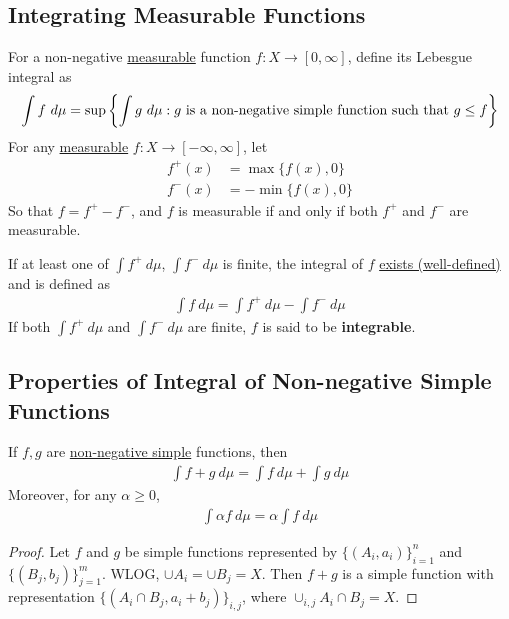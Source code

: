 \documentclass[11pt]{article}
\begin{document}
	\subsection{Integrating Measurable Functions}
	\begin{definition}
		For a non-negative \ul{measurable} function $f: X \to [0, \infty]$, define its Lebesgue integral as
		\begin{align}
			\int f\ d\mu = \sup \left\{\int g\ d\mu : g \text{{ is a non-negative simple function such that }} g \leq f \right\}
		\end{align}
		For any \ul{measurable} $f: X \to [-\infty, \infty]$, let
		\begin{align}
			f^+(x) &= \max\{f(x), 0\} \\
			f^-(x) &= - \min\{f(x), 0\}
		\end{align}
		So that $f = f^+ - f^-$, and $f$ is measurable if and only if both $f^+$ and $f^-$ are measurable.
	
		If at least one of $\int f^+\ d\mu$, $\int f^-\ d\mu$ is finite, the integral of $f$ \ul{exists (well-defined)} and is defined as
		\begin{align}
			\int f\ d\mu = \int f^+\ d\mu - \int f^-\ d\mu	
		\end{align}
		If both $\int f^+\ d\mu$ and $\int f^-\ d\mu$ are finite, $f$ is said to be \textbf{integrable}.
	\end{definition}
	
	\subsection{Properties of Integral of Non-negative Simple Functions}
	\begin{proposition}[Linearity]
		If $f, g$ are \ul{non-negative simple} functions, then
		\begin{align}
			\int f+g\ d\mu = \int f\ d\mu + \int g\ d\mu
		\end{align}
		Moreover, for any $\alpha \geq 0$,
		\begin{align}
			\int \alpha f\ d\mu = \alpha \int f\ d\mu
		\end{align}
		\begin{proof}
			Let $f$ and $g$ be simple functions represented by $\{(A_i, a_i)\}_{i=1}^n$ and $\{(B_j, b_j)\}_{j=1}^m$. WLOG, $\cup A_i = \cup B_j = X$. Then $f + g$ is a simple function with representation $\{(A_i \cap B_j, a_i + b_j)\}_{i,j}$, where $\cup_{i,j} A_i \cap B_j = X$.
		\end{proof}
	\end{proposition}
	
\end{document}
